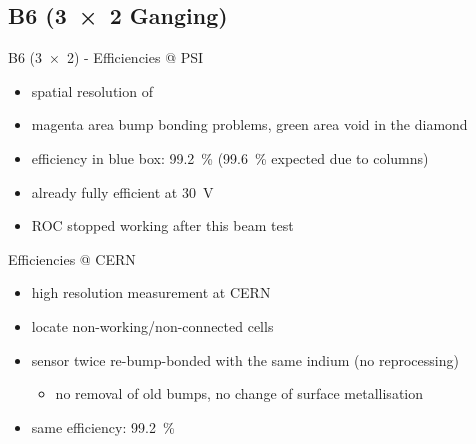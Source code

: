 \subsection{B6 (\SI{3x2}{} Ganging)}
\begin{frame}{B6 (\SI{3x2}{}) - Efficiencies @ PSI}

	
	\begin{itemize}\itemfill
		\item spatial resolution of 
		\item magenta area \ra bump bonding problems, green area \ra void in the diamond
		\item efficiency in blue box: \SI{99.2}{\%} (\ra \SI{99.6}{\%} expected due to columns)
		\item already fully efficient at \SI{30}{\volt}
		\item ROC stopped working after this beam test
	\end{itemize}
	
\end{frame}
% 
% 	
% 	
\begin{frame}{Efficiencies @ CERN}

	\vspace*{-2ex}\vspace*{-2ex}
	
	\begin{itemize}\itemfill
		\item high resolution measurement at CERN
		\item locate non-working/non-connected cells
		\item sensor twice re-bump-bonded with the same indium (no reprocessing)
		\begin{itemize}
			\item no removal of old bumps, no change of surface metallisation
		\end{itemize}
		\item same efficiency: \SI{99.2}{\%}
	\end{itemize}
	
\end{frame}
